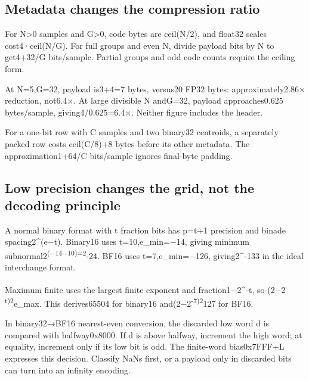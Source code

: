 \subsection{Metadata changes the compression ratio}\label{01-foundations-i-ch011-metadata-changes-the-compression-ratio}

\hypertarget{01-foundations-i-ch011-metadata-changes-the-compression-ratio}{}

For N\textgreater0 samples and G\textgreater0, code bytes are ceil(N/2), and float32 scales cost4·ceil(N/G). For full groups and even N, divide payload bits by N to get4+32/G bits/sample. Partial groups and odd code counts require the ceiling form.

At N=5,G=32, payload is3+4=7 bytes, versus20 FP32 bytes: approximately2.86× reduction, not6.4×. At large divisible N andG=32, payload approaches0.625 bytes/sample, giving4/0.625=6.4×. Neither figure includes the header.

For a one-bit row with C samples and two binary32 centroids, a separately packed row costs ceil(C/8)+8 bytes before its other metadata. The approximation1+64/C bits/sample ignores final-byte padding.

\subsection{Low precision changes the grid, not the decoding principle}\label{01-foundations-i-ch011-low-precision-changes-the-grid-not-the-decoding-principle}

\hypertarget{01-foundations-i-ch011-low-precision-changes-the-grid-not-the-decoding-principle}{}

A normal binary format with t fraction bits has p=t+1 precision and binade spacing2\^{}(e−t). Binary16 uses t=10,e\_min=−14, giving minimum subnormal2\textsuperscript{(−14−10)=2}-24. BF16 uses t=7,e\_min=−126, giving2\^{}-133 in the ideal interchange format.

Maximum finite uses the largest finite exponent and fraction1−2\^{}-t, so (2−2\textsuperscript{-t)2}e\_max. This derives65504 for binary16 and(2−2\textsuperscript{-7)2}127 for BF16.

In binary32→BF16 nearest-even conversion, the discarded low word d is compared with halfway0x8000. If d is above halfway, increment the high word; at equality, increment only if its low bit is odd. The finite-word bias0x7FFF+L expresses this decision. Classify NaNs first, or a payload only in discarded bits can turn into an infinity encoding.


